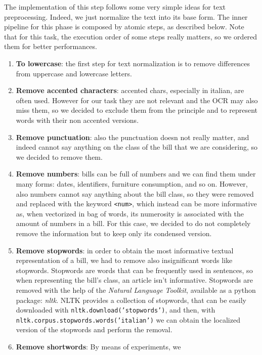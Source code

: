 \documentclass[10pt,twocolumn,letterpaper]{article}
\newcommand\codeinline[1]{\texttt{#1}}  %
\begin{document}
The implementation of this step follows some very simple ideas for
text preprocessing. Indeed, we just normalize the text into its base
form. The inner pipeline for this phase is composed by atomic steps,
as described below. Note that for this task, the execution order of
some steps really matters, so we ordered them for better performances.

\begin{enumerate}
  \item \textbf{To lowercase}: the first step for text normalization
    is to remove differences from uppercase and lowercase letters.
  \item \textbf{Remove accented characters}: accented chars,
    especially in italian, are often used. However for our task they
    are not relevant and the OCR may also miss them, so we decided to
    exclude them from the principle and to represent words with their
    non accented versions.
  \item \textbf{Remove punctuation}: also the punctuation doesn not
    really matter, and indeed cannot say anything on the class of the
    bill that we are considering, so we decided to remove them.
  \item \textbf{Remove numbers}: bills can be full of numbers and we
    can find them under many forms: dates, identifiers, furniture
    consumption, and so on. However, also numbers cannot say anything
    about the bill class, so they were removed and replaced with the
    keyword \codeinline{<num>}, which instead can be more informative
    as, when vectorized in bag of words, its numerosity is associated
    with the amount of numbers in a bill. For this case, we decided to
    do not completely remove the information but to keep only its
    condensed version.
  \item \textbf{Remove stopwords}: in order to obtain the most
    informative textual representation of a bill, we had to remove
    also insignificant words like stopwords. Stopwords are words that
    can be frequently used in sentences, so when representing the
    bill's class, an article isn't informative. Stopwords are removed
    with the help of the \emph{Natural Language Toolkit}, available as
    a python package: \emph{nltk}. NLTK provides a collection of
    stopwords, that can be easily downloaded with
    \codeinline{nltk.download('stopwords')}, and then, with
    \codeinline{nltk.corpus.stopwords.words('italian')} we can obtain
    the localized version of the stopwords and perform the removal.
  \item \textbf{Remove shortwords}: By means of experiments, we

\end{enumerate}
\end{document}
